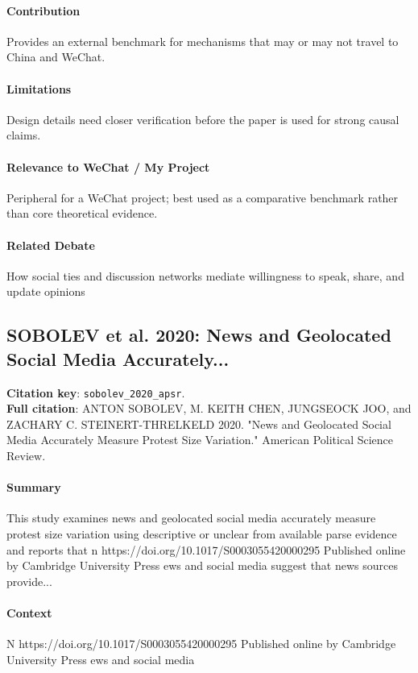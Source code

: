 \documentclass[12pt]{article}
\begin{document}
\paragraph{Contribution} Provides an external benchmark for mechanisms that may or may not travel to China and WeChat.

\paragraph{Limitations} Design details need closer verification before the paper is used for strong causal claims.

\paragraph{Relevance to WeChat / My Project} Peripheral for a WeChat project; best used as a comparative benchmark rather than core theoretical evidence.

\paragraph{Related Debate} How social ties and discussion networks mediate willingness to speak, share, and update opinions


\subsection{SOBOLEV et al. 2020: News and Geolocated Social Media Accurately...}
\textbf{Citation key}: \texttt{sobolev\_2020\_apsr}.\\
\textbf{Full citation}: ANTON SOBOLEV, M. KEITH CHEN, JUNGSEOCK JOO, and ZACHARY C. STEINERT-THRELKELD 2020. "News and Geolocated Social Media Accurately Measure Protest Size Variation." American Political Science Review.

\paragraph{Summary} This study examines news and geolocated social media accurately measure protest size variation using descriptive or unclear from available parse evidence and reports that n https://doi.org/10.1017/S0003055420000295 Published online by Cambridge University Press ews and social media suggest that news sources provide...

\paragraph{Context} N https://doi.org/10.1017/S0003055420000295 Published online by Cambridge University Press ews and social media
\end{document}
